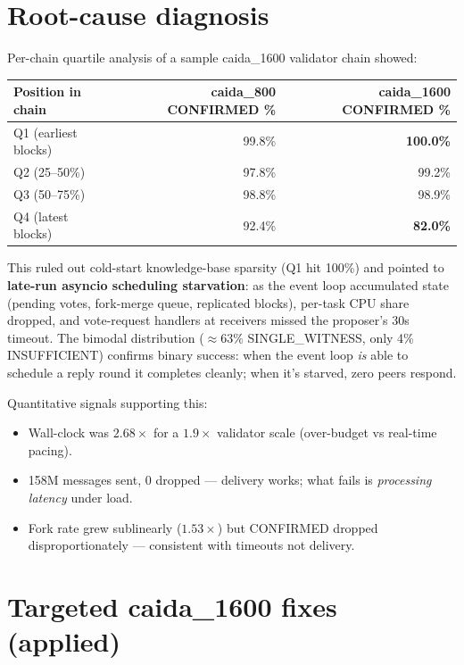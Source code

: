 \documentclass[10pt,a4paper]{article}
\newcommand{\good}[1]{\textcolor{good}{\textbf{#1}}}
\newcommand{\bad}[1]{\textcolor{bad}{\textbf{#1}}}
\begin{document}
\section{Root-cause diagnosis}

Per-chain quartile analysis of a sample caida\_1600 validator chain
showed:

\begin{table}[h]
\centering
\begin{tabular}{lrr}
\toprule
Position in chain & caida\_800 CONFIRMED \% & caida\_1600 CONFIRMED \% \\
\midrule
Q1 (earliest blocks) & 99.8\% & \good{100.0\%} \\
Q2 (25--50\%) & 97.8\% & 99.2\% \\
Q3 (50--75\%) & 98.8\% & 98.9\% \\
Q4 (latest blocks) & 92.4\% & \bad{82.0\%} \\
\bottomrule
\end{tabular}
\end{table}

This ruled out cold-start knowledge-base sparsity (Q1 hit 100\%) and
pointed to \textbf{late-run asyncio scheduling starvation}: as the
event loop accumulated state (pending votes, fork-merge queue,
replicated blocks), per-task CPU share dropped, and vote-request
handlers at receivers missed the proposer's 30s timeout.  The bimodal
distribution ($\approx 63\%$ SINGLE\_WITNESS, only 4\% INSUFFICIENT)
confirms binary success: when the event loop \emph{is} able to schedule
a reply round it completes cleanly; when it's starved, zero peers
respond.

Quantitative signals supporting this:

\begin{itemize}
\item Wall-clock was $2.68\times$ for a $1.9\times$ validator scale
  (over-budget vs real-time pacing).
\item 158M messages sent, 0 dropped --- delivery works; what fails is
  \emph{processing latency} under load.
\item Fork rate grew sublinearly ($1.53\times$) but CONFIRMED dropped
  disproportionately --- consistent with timeouts not delivery.
\end{itemize}

\section{Targeted caida\_1600 fixes (applied)}
\end{document}
